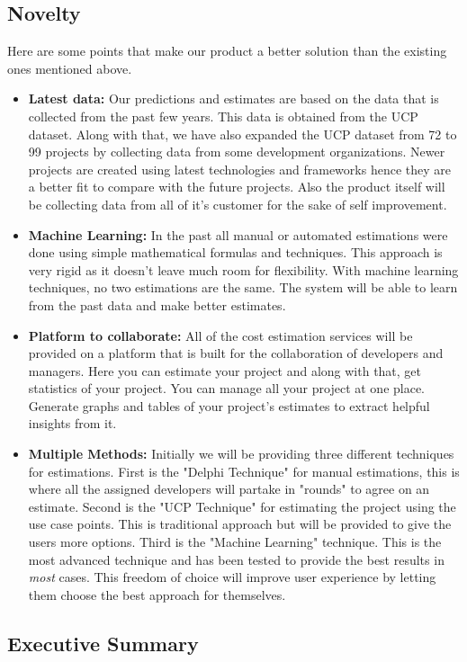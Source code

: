 \subsection{Novelty}
Here are some points that make our product a better solution than the existing ones mentioned above.

\begin{itemize}
	\item {\bfseries Latest data:} Our predictions and estimates are based on the data that is collected from the past few years. This data is obtained from the UCP dataset. Along with that, we have also expanded the UCP dataset from 72 to 99 projects by collecting data from some development organizations. Newer projects are created using latest technologies and frameworks hence they are a better fit to compare with the future projects. Also the product itself will be collecting data from all of it's customer for the sake of self improvement.
	
	
	\item {\bfseries Machine Learning:} In the past all manual or automated estimations were done using simple mathematical formulas and techniques. This approach is very rigid as it doesn't leave much room for flexibility. With machine learning techniques, no two estimations are the same. The system will be able to learn from the past data and make better estimates.
	

	\item {\bfseries Platform to collaborate:} All of the cost estimation services will be provided on a platform that is built for the collaboration of developers and managers. Here you can estimate your project and along with that, get statistics of your project. You can manage all your project at one place. Generate graphs and tables of your project's estimates to extract helpful insights from it.
	

	\item {\bfseries Multiple Methods:} Initially we will be providing three different techniques for estimations. First is the "Delphi Technique" for manual estimations, this is where all the assigned developers will partake in "rounds" to agree on an estimate. Second is the "UCP Technique" for estimating the project using the use case points. This is traditional approach but will be provided to give the users more options. Third is the "Machine Learning" technique. This is the most advanced technique and has been tested to provide the best results in {\it{most}} cases. This freedom of choice will improve user experience by letting them choose the best approach for themselves.
\end{itemize}








\subsection{Executive Summary}
\blindtext


\blindtext

